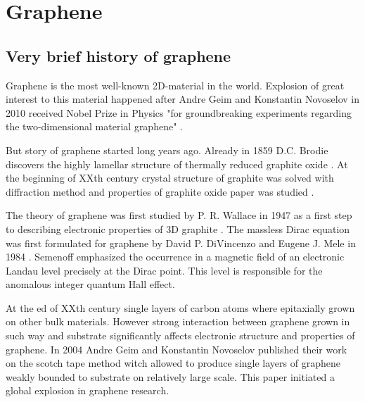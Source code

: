 \newpage
\section{Graphene}
\subsection{Very brief history of graphene}
Graphene is the most well-known 2D-material in the world.  Explosion of great interest to this material happened after Andre Geim and Konstantin Novoselov in 2010 received Nobel Prize in Physics "for groundbreaking experiments regarding the two-dimensional material graphene" \cite{geim}. 

But story of graphene started long years ago. Already in 1859 D.C. Brodie discovers the highly lamellar structure of thermally reduced graphite oxide \cite{brodie}. At the beginning of XXth century crystal structure of graphite was solved with diffraction method \cite{debije, bernal} and properties of graphite oxide paper was studied \cite{haenni}.

The theory of graphene was first studied by P. R. Wallace in 1947 as a first step to describing electronic properties of 3D graphite \cite{wallace}. The massless Dirac equation was first formulated for graphene by David P. DiVincenzo and Eugene J. Mele in 1984 \cite{divincenzo}. Semenoff emphasized the occurrence in a magnetic field of an electronic Landau level precisely at the Dirac point. This level is responsible for the anomalous integer quantum Hall effect.

At the ed of XXth century single layers of carbon atoms where epitaxially grown on other bulk materials\cite{epitaxial}. However strong interaction between graphene grown in such way and substrate significantly affects electronic structure and properties of graphene. In 2004 Andre Geim and Konstantin Novoselov published their work on the scotch tape method witch allowed to produce single layers of graphene weakly bounded to substrate on relatively large scale\cite{geim-science}. This paper initiated a global explosion in graphene research.

